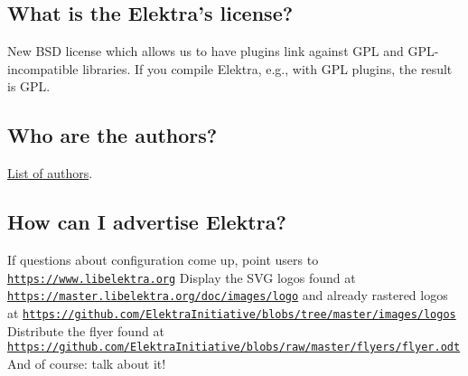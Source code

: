 \subsection*{What is the Elektra’s license?}

New B\+SD license which allows us to have plugins link against G\+PL and G\+P\+L-\/incompatible libraries. If you compile Elektra, e.\+g., with G\+PL plugins, the result is G\+PL.

\subsection*{Who are the authors?}

\hyperlink{doc_AUTHORS_md}{List of authors}.

\subsection*{How can I advertise Elektra?}

If questions about configuration come up, point users to \href{https://www.libelektra.org}{\tt https\+://www.\+libelektra.\+org} Display the S\+VG logos found at \href{https://master.libelektra.org/doc/images/logo}{\tt https\+://master.\+libelektra.\+org/doc/images/logo} and already rastered logos at \href{https://github.com/ElektraInitiative/blobs/tree/master/images/logos}{\tt https\+://github.\+com/\+Elektra\+Initiative/blobs/tree/master/images/logos} Distribute the flyer found at \href{https://github.com/ElektraInitiative/blobs/raw/master/flyers/flyer.odt}{\tt https\+://github.\+com/\+Elektra\+Initiative/blobs/raw/master/flyers/flyer.\+odt} And of course\+: talk about it! 